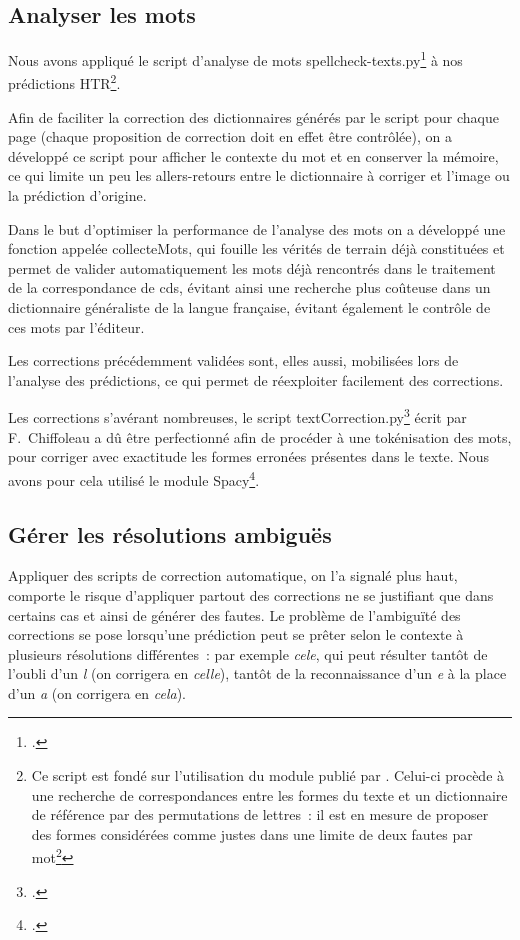 \documentclass[a4paper,12pt,twoside]{book}
\begin{document}
			\subsection{Analyser les mots}
				Nous avons appliqué le script d'analyse de mots \textsf{spellcheck-texts.py}\footcite{biaySpellcheckTextsPy2022} à nos prédictions HTR\footnote{Ce script est fondé sur l'utilisation du module publié par  \cite{barrusPyspellcheckerPurePython}. Celui-ci procède à une recherche de correspondances entre les formes du texte et un dictionnaire de référence par des permutations de lettres~: il est en mesure de proposer des formes considérées comme justes dans une limite de deux fautes par mot\footnote{Par exemple, il reconnaît que la meilleure proposition pour le mot \textit{deusx} est \textit{deux}, mais n'est pas capable d'associer la forme \textit{pubièes} aux mots de la famille de \textit{publier}}}.
						
				Afin de faciliter la correction des dictionnaires générés par le script pour chaque page (chaque proposition de correction doit en effet être contrôlée), on a développé ce script pour afficher le contexte du mot et en conserver la mémoire, ce qui limite un peu les allers-retours entre le dictionnaire à corriger et l'image ou la prédiction d'origine.
				
				Dans le but d'optimiser la performance de l'analyse des mots on a développé une fonction appelée \textsf{collecteMots}, qui fouille les vérités de terrain déjà constituées et permet de valider automatiquement les mots déjà rencontrés dans le traitement de la correspondance de \gls{cds}, évitant ainsi une recherche plus coûteuse dans un dictionnaire généraliste de la langue française, évitant également le contrôle de ces mots par l'éditeur.
				
				Les corrections précédemment validées sont, elles aussi, mobilisées lors de l'analyse des prédictions, ce qui permet de réexploiter facilement des corrections.
				
				Les corrections s'avérant nombreuses, le script \textsf{textCorrection.py}\footcite{biayTextCorrectionPy2022} écrit par F.~Chiffoleau a dû être perfectionné afin de procéder à une tokénisation des mots, pour corriger avec exactitude les formes erronées présentes dans le texte. Nous avons pour cela utilisé le module Spacy\footcite{SpaCyIndustrialstrengthNatural}.
								
			\subsection{Gérer les résolutions ambiguës}
				Appliquer des scripts de correction automatique, on l'a signalé plus haut, comporte le risque d'appliquer partout des corrections ne se justifiant que dans certains cas et ainsi de générer des fautes. Le problème de l'ambiguïté des corrections se pose lorsqu'une prédiction peut se prêter selon le contexte à plusieurs résolutions différentes~: par exemple \textit{cele}, qui peut résulter tantôt de l'oubli d'un \textit{l} (on corrigera en \textit{celle}), tantôt de la reconnaissance d'un \textit{e} à la place d'un \textit{a} (on corrigera en \textit{cela}).
							
\end{document}
